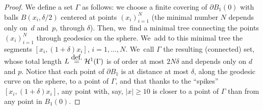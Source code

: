 \documentclass[11pt]{article}
\numberwithin{equation}{section}
\theoremstyle{definition}
\newcommand{\eqdef}{\ensuremath{\stackrel{\mbox{\upshape\tiny def.}}{=}}}
\newcommand\cH{\mathcal{H}}
\begin{document}
\begin{proof}
We define a set $\Gamma$ as follows: we choose a finite covering of
$\partial B_1(0)$ with balls $B(x_i,\delta/2)$ centered
at points $(x_i)_{i=1}^N$ (the minimal number $N$ depends only on~$d$ and~$p$, through $\delta$).
Then, we~find a minimal tree connecting the points $(x_i)_{i=1}^N$ through geodesics on the sphere. We~add to this minimal tree the segments $[x_i,(1+\delta)x_i]$, $i=1,\dots,N$. We~call $\Gamma$ the resulting (connected) set,
whose total length $L\eqdef \cH^1(\Gamma)$ is of order at most $2N\delta$ and depends
only on $d$ and $p$.
Notice that each point of $\partial B_1$ is at distance at most $\delta$,
along the geodesic curve on the sphere, to a point of $\Gamma$, and that thanks to
the ``spikes'' $[x_i,(1+\delta) x_i]$, any point with, say, $|x|\ge 10$ is closer to
a point of $\Gamma$ than from any point in $B_1(0)$.


\end{proof}
\end{document}
